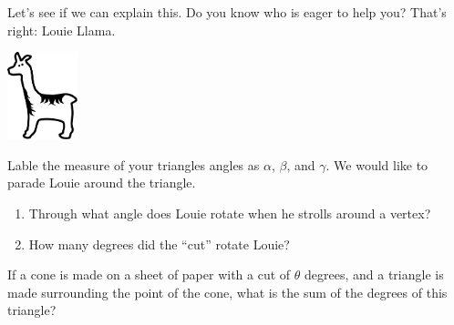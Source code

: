 \documentclass[handout,nooutcomes,noauthor]{ximera}
\begin{document}
\mynewpage


\begin{question}
  Let's see if we can explain this. Do you know who is eager to help
you? That's right: Louie Llama.
\begin{center}
\includegraphics[height=1in]{llama.pdf}
\end{center}

Lable the measure of your triangles angles as $\alpha$, $\beta$, and
$\gamma$. We would like to parade Louie around the triangle.
\begin{enumerate}
\item Through what angle does Louie rotate when he strolls around a
  vertex?
\item How many degrees did the ``cut'' rotate Louie? 
\end{enumerate}

\end{question}

\mynewpage


\begin{question}
If a cone is made on a sheet of paper with a cut of $\theta$ degrees,
and a triangle is made surrounding the point of the cone, what is the
sum of the degrees of this triangle?
\end{question}
\end{document}
